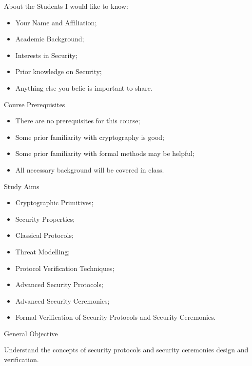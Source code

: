 \documentclass[12pt]{beamer}
\begin{document}
\begin{frame}{About the Students}
I would like to know:
\begin{itemize}
\item Your Name and Affiliation;\pause
\item Academic Background;\pause
\item Interests in Security;\pause
\item Prior knowledge on Security;\pause
\item Anything else you belie is important to share.
\end{itemize}
\end{frame}


\begin{frame}{Course Prerequisites}
\begin{itemize}
\item There are no prerequisites for this course;\pause
\item Some prior familiarity with cryptography is good;\pause
\item Some prior familiarity with formal methods may be helpful;\pause
\item All necessary background will be covered in class.
\end{itemize}
\end{frame}

\begin{frame}{Study Aims}
\begin{itemize}
\item Cryptographic Primitives;\pause
\item Security Properties;
\item Classical Protocols;\pause
\item Threat Modelling;\pause
\item Protocol Verification Techniques;\pause
\item Advanced Security Protocols;\pause
\item Advanced Security Ceremonies;\pause
\item Formal Verification of Security Protocols and Security Ceremonies.
\end{itemize}
\end{frame}

\begin{frame}{General Objective}

{\Large Understand the concepts of security protocols and security ceremonies design and verification.}

\end{frame}
\end{document}
